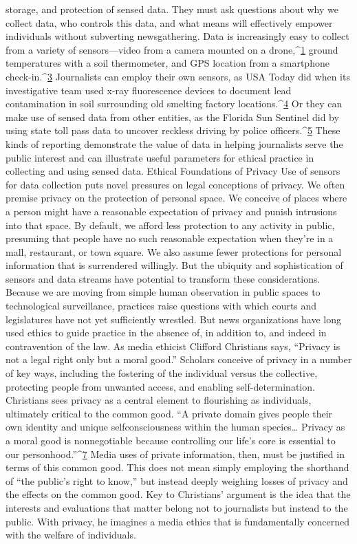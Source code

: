 storage, and protection of sensed data. They must ask questions about why
we collect data, who controls this data, and what means will effectively
empower individuals without subverting newsgathering.
Data is increasingly easy to collect from a variety of sensors—video from a
camera mounted on a drone,^{\href{#endnotes-culver}{1}} ground temperatures with a soil thermometer, and GPS location from a smartphone check-in.^{\href{#endnotes-culver}{3}} Journalists can employ
their own sensors, as USA Today did when its investigative team used x-ray
fluorescence devices to document lead contamination in soil surrounding
old smelting factory locations.^{\href{#endnotes-culver}{4}} Or they can make use of sensed data from
other entities, as the Florida Sun Sentinel did by using state toll pass data to
uncover reckless driving by police officers.^{\href{#endnotes-culver}{5}}
These kinds of reporting demonstrate the value of data in helping journalists
serve the public interest and can illustrate useful parameters for ethical
practice in collecting and using sensed data.
Ethical Foundations of Privacy
Use of sensors for data collection puts novel pressures on legal conceptions
of privacy. We often premise privacy on the protection of personal space.
We conceive of places where a person might have a reasonable expectation
of privacy and punish intrusions into that space. By default, we afford less
protection to any activity in public, presuming that people have no such reasonable expectation when they're in a mall, restaurant, or town square.
We also assume fewer protections for personal information that is surrendered
willingly.
But the ubiquity and sophistication of sensors and data streams have potential
to transform these considerations. Because we are moving from simple
human observation in public spaces to technological surveillance, practices
raise questions with which courts and legislatures have not yet sufficiently
wrestled. But news organizations have long used ethics to guide practice in
the absence of, in addition to, and indeed in contravention of the law. As
media ethicist Clifford Christians says, ``Privacy is not a legal right only but
a moral good.''
Scholars conceive of privacy in a number of key ways, including the fostering
of the individual versus the collective, protecting people from unwanted
access, and enabling self-determination. Christians sees privacy as a central
element to flourishing as individuals, ultimately critical to the common
good. ``A private domain gives people their own identity and unique selfconsciousness
within the human species… Privacy as a moral good is nonnegotiable
because controlling our life's core is essential to our personhood.''^{\href{#endnotes-culver}{7}}
Media uses of private information, then, must be justified in terms of this
common good. This does not mean simply employing the shorthand of ``the
public's right to know,'' but instead deeply weighing losses of privacy and
the effects on the common good. Key to Christians' argument is the idea
that the interests and evaluations that matter belong not to journalists but
instead to the public. With privacy, he imagines a media ethics that is fundamentally
concerned with the welfare of individuals.



